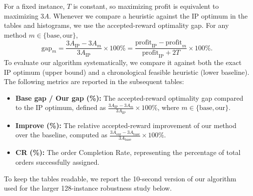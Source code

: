 \documentclass[10pt,a4paper]{article}
\begin{document}
For a fixed instance, $T$ is constant, so maximizing profit is equivalent to
maximizing $3A$.  Whenever we compare a heuristic against the IP optimum in the
tables and histograms, we use the accepted-reward optimality gap.  For any method
$m\in\{\mathrm{base},\mathrm{our}\}$,
\[
\text{gap}_m
=\frac{3A_{\mathrm{IP}}-3A_m}{3A_{\mathrm{IP}}}\times 100\%
=\frac{\text{profit}_{\mathrm{IP}}-\text{profit}_{m}}
{\text{profit}_{\mathrm{IP}}+2T}\times 100\%.
\]
To evaluate our algorithm systematically, we compare it against both the exact IP optimum (upper bound) and a chronological feasible heuristic (lower baseline). The following metrics are reported in the subsequent tables:
\begin{itemize}[itemsep=2pt, parsep=0pt, topsep=4pt]
    \item \textbf{Base gap / Our gap (\%):} The accepted-reward optimality gap compared to the IP optimum, defined as $\frac{3A_{\mathrm{IP}} - 3A_m}{3A_{\mathrm{IP}}} \times 100\%$, where $m \in \{\mathrm{base}, \mathrm{our}\}$.
    \item \textbf{Improve (\%):} The relative accepted-reward improvement of our method over the baseline, computed as $\frac{3A_{\mathrm{our}} - 3A_{\mathrm{base}}}{3A_{\mathrm{base}}} \times 100\%$.
    \item \textbf{CR (\%):} The order Completion Rate, representing the percentage of total orders successfully assigned.
\end{itemize}
To keep the tables readable, we report the 10-second version of our algorithm used for the larger 128-instance robustness study below.
\end{document}
